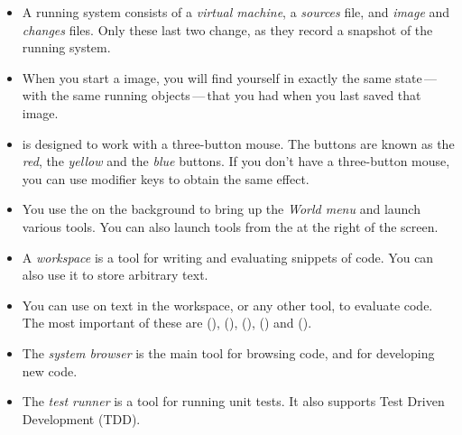 \documentclass[a4paper,10pt,twoside]{book}
\begin{document}
\begin{itemize}
  \item A running \sq system consists of a \emph{virtual machine}, a \emph{sources} file, and \emph{image} and \emph{changes} files.
  Only these last two change, as they record a snapshot of the running system.
  \item When you start a \sq image, you will find yourself in exactly the same state\,---\,with the same running objects\,---\,that you had when you last saved that image.
  \item \sq is designed to work with a three-button mouse.
  The buttons are known as the \emph{red}, the \emph{yellow} and the \emph{blue} buttons. If you don't have a three-button mouse, you can use modifier keys to obtain the same effect.
  \item You use the  on the \sq background to bring up the \emph{World menu} and launch various tools.
  You can also launch tools from the \toolsflapind at the right of the \sq screen.
  \item A \emph{workspace} is a tool for writing and evaluating snippets of code.
  You can also use it to store arbitrary text.
  \item You can use  on text in the workspace, or any other tool, to evaluate code.
  The most important of these are  (),  (),  (),  () and  ().
  \item The \emph{system browser} is the main tool for browsing \sq code, and for developing new code.
  \item The \emph{test runner} is a tool for running unit tests.
  It also supports Test Driven Development (TDD).
\end{itemize}

\ifx\wholebook\relax\else
   
   
\end{document}
